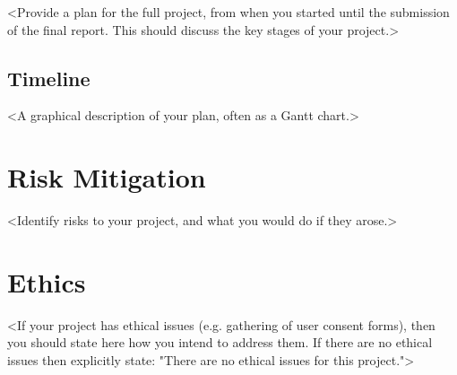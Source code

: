 <Provide a plan for the full project, from when you started until the submission of the final report. This should discuss the key stages of your project.>

\subsection{Timeline}

<A graphical description of your plan, often as a Gantt chart.>




%
%
\section{Risk Mitigation}

<Identify risks to your project, and what you would do if they arose.>


%
%
\section{Ethics}

<If your project has ethical issues (e.g. gathering of user consent forms), then you should state here how you intend to address them. If there are no ethical issues then explicitly state: "There are no ethical issues for this project.">